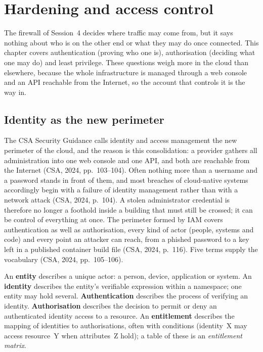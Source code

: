 \chapter{Hardening and access control}

The firewall of Session~4 decides where traffic may come from, but it says
nothing about who is on the other end or what they may do once connected.
This chapter covers authentication (proving who one is), authorisation
(deciding what one may do) and least privilege. These questions weigh more
in the cloud than elsewhere, because the whole infrastructure is managed
through a web console and an API reachable from the Internet, so the account
that controls it is the way in.

\section{Identity as the new perimeter}

The CSA Security Guidance calls identity and access management the new
perimeter of the cloud, and the reason is this consolidation: a provider
gathers all administration into one web console and one API, and both are
reachable from the Internet (CSA, 2024, pp.~103--104). Often nothing more
than a username and a password stands in front of them, and most breaches of
cloud-native systems accordingly begin with a failure of identity management
rather than with a network attack (CSA, 2024, p.~104). A stolen
administrator credential is therefore no longer a foothold inside a building
that must still be crossed; it can be control of everything at once. The
perimeter formed by IAM covers authentication as well as authorisation,
every kind of actor (people, systems and code) and every point an attacker
can reach, from a phished password to a key left in a published container
build file (CSA, 2024, p.~116). Five terms supply the vocabulary (CSA, 2024,
pp.~105--106).

\begin{definition}\label{def:iam}
An \textbf{entity} describes a unique actor: a person, device, application or
system. An \textbf{identity} describes the entity's verifiable expression
within a namespace; one entity may hold several. \textbf{Authentication}
describes the process of verifying an identity. \textbf{Authorisation}
describes the decision to permit or deny an authenticated identity access to
a resource. An \textbf{entitlement} describes the mapping of identities to
authorisations, often with conditions (identity~X may access resource~Y when
attributes~Z hold); a table of these is an \emph{entitlement matrix}.
\end{definition}

